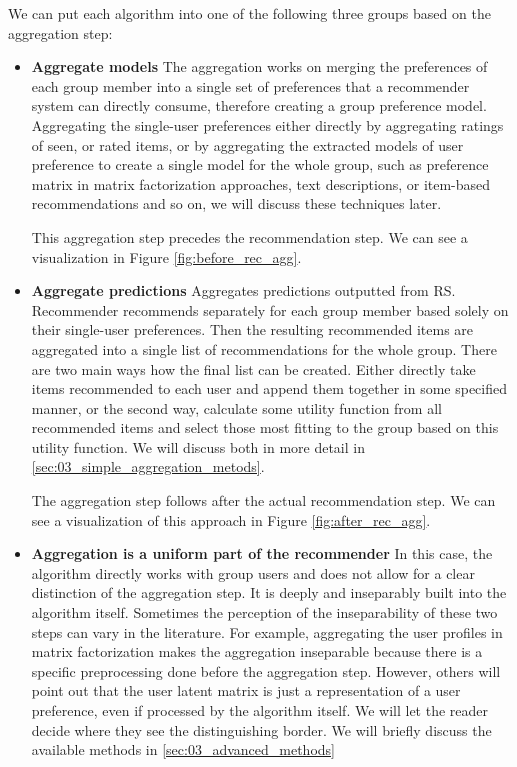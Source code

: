 We can put each algorithm into one of the following three groups based on the aggregation step:
\begin{itemize}
    \item \textbf{Aggregate models} \newline
    The aggregation works on merging the preferences of each group member into a single set of preferences that a recommender system can directly consume, therefore creating a group preference model. Aggregating the single-user preferences either directly by aggregating ratings of seen, or rated items, or by aggregating the extracted models of user preference to create a single model for the whole group, such as preference matrix in matrix factorization approaches, text descriptions, or item-based recommendations and so on, we will discuss these techniques later.
    
    
    This aggregation step precedes the recommendation step. We can see a visualization in Figure \ref{fig:before_rec_agg}.
    
    
    \item \textbf{Aggregate predictions} \newline
     Aggregates predictions outputted from RS. Recommender recommends separately for each group member based solely on their single-user preferences. Then the resulting recommended items are aggregated into a single list of recommendations for the whole group. There are two main ways how the final list can be created. Either directly take items recommended to each user and append them together in some specified manner, or the second way, calculate some utility function from all recommended items and select those most fitting to the group based on this utility function. We will discuss both in more detail in \ref{sec:03_simple_aggregation_metods}.
     
     The aggregation step follows after the actual recommendation step. We can see a visualization of this approach in Figure \ref{fig:after_rec_agg}.
     
    \item \textbf{Aggregation is a uniform part of the recommender} \newline
    In this case, the algorithm directly works with group users and does not allow for a clear distinction of the aggregation step. It is deeply and inseparably built into the algorithm itself. Sometimes the perception of the inseparability of these two steps can vary in the literature. For example, aggregating the user profiles in matrix factorization makes the aggregation inseparable because there is a specific preprocessing done before the aggregation step. However, others will point out that the user latent matrix is just a representation of a user preference, even if processed by the algorithm itself. We will let the reader decide where they see the distinguishing border. We will briefly discuss the available methods in \ref{sec:03_advanced_methods}
\end{itemize}


